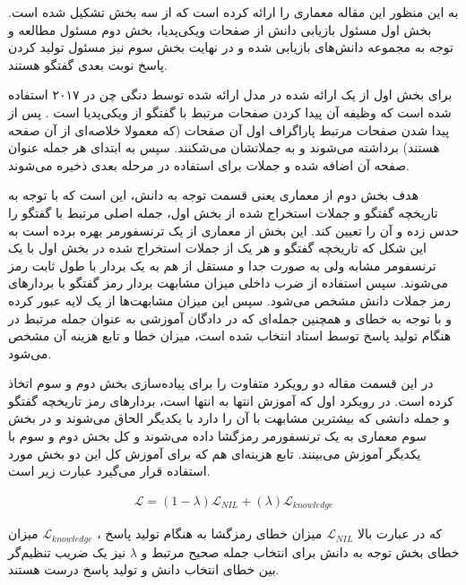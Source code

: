 به این منظور این مقاله معماری را ارائه کرده است که از سه بخش تشکیل شده است. بخش اول مسئول بازیابی دانش از صفحات ویکی‌پدیا، بخش دوم مسئول مطالعه و توجه به مجموعه دانش‌های بازیابی شده و در نهایت بخش سوم نیز مسئول تولید کردن پاسخ نوبت بعدی گفتگو هستند.

برای بخش اول از یک 
 ارائه شده در 
مدل ارائه شده توسط دنگی چن در ۲۰۱۷
استفاده شده است که وظیفه آن  پیدا کردن صفحات مرتبط با گفتگو از ویکی‌پدیا است
\cite{drqa_paper}
. پس از پیدا شدن صفحات مرتبط پاراگراف اول آن صفحات (که معمولا خلاصه‌ای از آن صفحه هستند) برداشته می‌شوند و به جملاتشان می‌‌شکنند. سپس به ابتدای هر جمله عنوان صفحه آن اضافه شده و جملات برای استفاده در مرحله بعدی ذخیره می‌شوند. 

هدف بخش دوم از معماری یعنی قسمت توجه به دانش، این است که با توجه به تاریخچه گفتگو و جملات استخراج شده از بخش اول، جمله اصلی مرتبط با گفتگو را حدس زده و آن را تعیین کند. این بخش از معماری از یک ترنسفورمر بهره برده است به این شکل که تاریخچه گفتگو و هر یک از جملات استخراج شده در بخش اول با یک ترنسفومر مشابه ولی به صورت جدا و مستقل از هم به یک بردار با طول ثابت رمز می‌شوند. سپس استفاده از ضرب داخلی میزان مشابهت بردار رمز  گفتگو با بردارهای رمز جملات دانش مشخص می‌شود. سپس این میزان مشابهت‌ها از یک لایه 
عبور کرده و با توجه به خطای 
و همچنین جمله‌ای که در دادگان آموزشی به عنوان جمله مرتبط در هنگام تولید پاسخ توسط استاد انتخاب شده است، میزان خطا و تابع هزینه آن مشخص می‌شود.

 در این قسمت مقاله دو رویکرد متفاوت را برای پیاده‌سازی بخش دوم و سوم اتخاذ کرده است. در رویکرد اول که آموزش انتها به انتها است، بردار‌های رمز  تاریخچه گفتگو و جمله دانشی که بیشترین مشابهت با آن را دارد با یکدیگر الحاق می‌شوند و در بخش سوم معماری به یک ترنسفورمر رمزگشا داده می‌شوند و کل بخش دوم و سوم با یکدیگر آموزش می‌بینند.
تابع هزینه‌ای هم که برای آموزش کل این دو بخش مورد استفاده قرار می‌گیرد عبارت زیر است.


\begin{equation}\begin{split}
\mathcal{L} = (1- \lambda ) \mathcal{L}_{NIL} + (\lambda) \mathcal{L}_{knowledge}
\end{split}\end{equation}

که در عبارت بالا
$\mathcal{L}_{NIL}$
میزان خطای رمزگشا به هنگام تولید پاسخ
،
$\mathcal{L}_{knowledge}$
میزان خطای بخش توجه به دانش برای انتخاب جمله صحیح مرتبط
و
$\lambda$
نیز یک ضریب تنظیم‌گر بین خطای انتخاب دانش و تولید پاسخ درست هستند.

